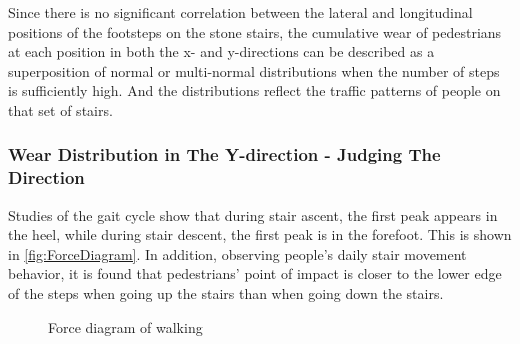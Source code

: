 \documentclass[12pt]{article}  %
\numberwithin{equation}{section} %
\begin{document}
Since there is no significant correlation between the lateral and longitudinal positions of the footsteps on the stone stairs, the cumulative wear of pedestrians at each position in both the x- and y-directions can be described as a superposition of normal or multi-normal distributions when the number of steps is sufficiently high. And the distributions reflect the traffic patterns of people on that set of stairs.
\subsubsection{Wear Distribution in The Y-direction - Judging The Direction}
Studies of the gait cycle show that during stair ascent, the first peak appears in the heel, while during stair descent, the first peak is in the forefoot. This is shown in \autoref{fig:ForceDiagram}. In addition, observing people's daily stair movement behavior, it is found that pedestrians' point of impact is closer to the lower edge of the steps when going up the stairs than when going down the stairs\cite{3}. 
\begin{figure}[H]
\vspace{-1.0em}
	\centering    
	\caption{Force diagram of walking}		%
	\label{fig:ForceDiagram}									%
    \vspace{-1.0em}
\end{figure}
\end{document}

